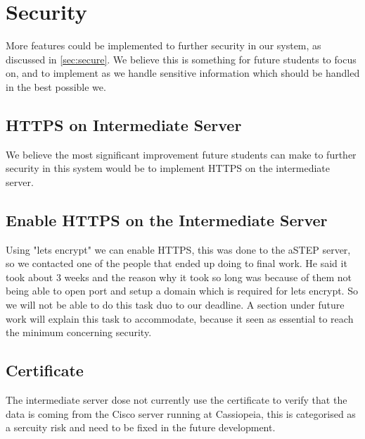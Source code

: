 \section{Security}\label{sec:fucture_secure}
More features could be implemented to further security in our system, as discussed in \cref{sec:secure}. We believe this is something for future students to focus on, and to implement as we handle sensitive information which should be handled in the best possible we.

\subsection*{HTTPS on Intermediate Server}
We believe the most significant improvement future students can make to further security in this system would be to implement HTTPS on the intermediate server.
\subsection*{Enable HTTPS on the Intermediate Server}
Using "lets encrypt" we can enable HTTPS, this was done to the aSTEP server, so we contacted one of the people that ended up doing to final work. He said it took about 3 weeks and the reason why it took so long was because of them not being able to open port and setup a domain which is required for lets encrypt. So we will not be able to do this task duo to our deadline. A section under future work will explain this task to accommodate, because it seen as essential to reach the minimum concerning security.
\subsection*{Certificate}
The intermediate server dose not currently use the certificate to verify that the data is coming from the Cisco server running at Cassiopeia, this is categorised as a sercuity risk and need to be fixed in the future development.